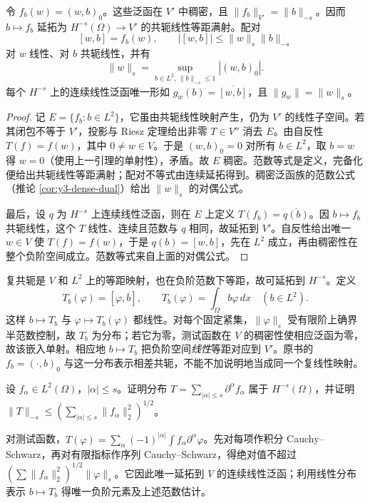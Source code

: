 \begin{theorem}[负阶完备化与对偶]\label{thm:y3-negative-dual}
令 $f_b(w)=(w,b)_0$。这些泛函在 $V'$ 中稠密，且 $\|f_b\|_{V'}=\|b\|_{-s}$。因而 $b\mapsto f_b$ 延拓为 $H^{-s}(\Omega)\to V'$ 的共轭线性等距满射。配对
\[
 [w,b]=f_b(w),\qquad |[w,b]|\le\|w\|_s\|b\|_{-s}
\]
对 $w$ 线性、对 $b$ 共轭线性，并有
\[
 \|w\|_s=\sup_{b\in L^2,\,\|b\|_{-s}\le1}|(w,b)_0|.
\]
每个 $H^{-s}$ 上的连续线性泛函唯一形如 $g_w(b)=\overline{[w,b]}$，且 $\|g_w\|=\|w\|_s$。
\end{theorem}
\begin{proof}
记 $E=\{f_b:b\in L^2\}$，它虽由共轭线性映射产生，仍为 $V'$ 的线性子空间。若其闭包不等于 $V'$，投影与 Riesz 定理给出非零 $T\in V''$ 消去 $E$。由自反性 $T(f)=f(w)$，其中 $0\ne w\in V$。于是 $(w,b)_0=0$ 对所有 $b\in L^2$，取 $b=w$ 得 $w=0$（使用上一引理的单射性），矛盾。故 $E$ 稠密。范数等式是定义，完备化便给出共轭线性等距满射；配对不等式由连续延拓得到。稠密泛函族的范数公式（推论 \ref{cor:y3-dense-dual}）给出 $\|w\|_s$ 的对偶公式。

最后，设 $q$ 为 $H^{-s}$ 上连续线性泛函，则在 $E$ 上定义 $T(f_b)=\overline{q(b)}$。因 $b\mapsto f_b$ 共轭线性，这个 $T$ 线性、连续且范数与 $q$ 相同，故延拓到 $V'$。自反性给出唯一 $w\in V$ 使 $T(f)=f(w)$，于是 $q(b)=\overline{[w,b]}$，先在 $L^2$ 成立，再由稠密性在整个负阶空间成立。范数等式来自上面的对偶公式。
\end{proof}

\begin{remark}[与本稿线性分布配对的衔接]
复共轭是 $V$ 和 $L^2$ 上的等距映射，也在负阶范数下等距，故可延拓到 $H^{-s}$。定义
\[
 T_b(\varphi)=[\varphi,\overline b],\qquad
 T_b(\varphi)=\int_\Omega b\varphi\,dx\quad(b\in L^2).
\]
这样 $b\mapsto T_b$ 与 $\varphi\mapsto T_b(\varphi)$ 都线性。对每个固定紧集，$\|\varphi\|_s$ 受有限阶上确界半范数控制，故 $T_b$ 为分布；若它为零，测试函数在 $V$ 的稠密性使相应泛函为零，故该嵌入单射。相应地 $b\mapsto T_b$ 把负阶空间\emph{线性}等距对应到 $V'$。原书的 $f_b=(\cdot,b)_0$ 与这一分布表示相差共轭，不能不加说明地当成同一个复线性映射。
\end{remark}

\begin{exercise}
设 $f_\alpha\in L^2(\Omega)$，$|\alpha|\le s$。证明分布 $T=\sum_{|\alpha|\le s}\partial^\alpha f_\alpha$ 属于 $H^{-s}(\Omega)$，并证明
$\|T\|_{-s}\le(\sum_{|\alpha|\le s}\|f_\alpha\|_2^2)^{1/2}$。
\end{exercise}
\begin{solution}
对测试函数，$T(\varphi)=\sum_\alpha(-1)^{|\alpha|}\int f_\alpha\partial^\alpha\varphi$。先对每项作积分 Cauchy--Schwarz，再对有限指标作序列 Cauchy--Schwarz，得绝对值不超过 $(\sum\|f_\alpha\|_2^2)^{1/2}\|\varphi\|_s$。它因此唯一延拓到 $V$ 的连续线性泛函；利用线性分布表示 $b\mapsto T_b$ 得唯一负阶元素及上述范数估计。
\end{solution}
